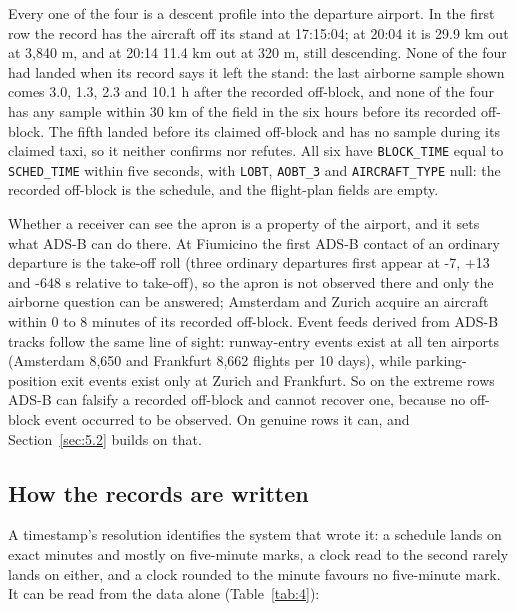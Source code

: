 \documentclass[
  manuscript=article,
  layout=preprint,
  year=2026,
  volume=x,
]{extra/joas}
\begin{document}
Every one of the four is a descent profile into the departure airport. In the first row the record has the aircraft off its stand at 17:15:04; at 20:04 it is 29.9 km out at 3,840 m, and at 20:14 11.4 km out at 320 m, still descending. None of the four had landed when its record says it left the stand: the last airborne sample shown comes 3.0, 1.3, 2.3 and 10.1 h after the recorded off-block, and none of the four has any sample within 30 km of the field in the six hours before its recorded off-block. The fifth landed before its claimed off-block and has no sample during its claimed taxi, so it neither confirms nor refutes. All six have \texttt{BLOCK\_TIME} equal to \texttt{SCHED\_TIME} within five seconds, with \texttt{LOBT}, \texttt{AOBT\_3} and \texttt{AIRCRAFT\_TYPE} null: the recorded off-block is the schedule, and the flight-plan fields are empty.

Whether a receiver can see the apron is a property of the airport, and it sets what ADS-B can do there. At Fiumicino the first ADS-B contact of an ordinary departure is the take-off roll (three ordinary departures first appear at -7, +13 and -648 s relative to take-off), so the apron is not observed there and only the airborne question can be answered; Amsterdam and Zurich acquire an aircraft within 0 to 8 minutes of its recorded off-block. Event feeds derived from ADS-B tracks follow the same line of sight: runway-entry events exist at all ten airports (Amsterdam 8,650 and Frankfurt 8,662 flights per 10 days), while parking-position exit events exist only at Zurich and Frankfurt. So on the extreme rows ADS-B can falsify a recorded off-block and cannot recover one, because no off-block event occurred to be observed. On genuine rows it can, and Section~\ref{sec:5.2} builds on that.

\subsection{How the records are written}\label{sec:4.3}

A timestamp's resolution identifies the system that wrote it: a schedule lands on exact minutes and mostly on five-minute marks, a clock read to the second rarely lands on either, and a clock rounded to the minute favours no five-minute mark. It can be read from the data alone (Table~\ref{tab:4}):
\end{document}

